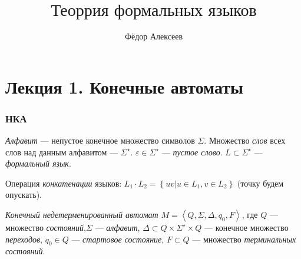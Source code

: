 

\newenvironment{lyxcode}
{\par\begin{list}{}{
\setlength{\rightmargin}{\leftmargin}
\setlength{\listparindent}{0pt}%
\raggedright
\setlength{\itemsep}{0pt}
\setlength{\parsep}{0pt}
\normalfont\ttfamily}%
 \item[]}
{\end{list}}



\title{$\mbox{Теоррия формальных языков}$}
\author{Фёдор Алексеев}

\maketitle
\gitlink\tableofcontents\newpage{}

\part*{Лекция 1. Конечные автоматы}

\section{НКА}
\begin{define*}
\emph{Алфавит} --- непустое конечное множество символов $\Sigma$.
Множество \emph{слов} всех слов над данным алфавитом --- $\Sigma^{\star}$.
$\varepsilon\in\Sigma^{\star}$ --- \emph{пустое слово}. $L\subset\Sigma^{\star}$
--- \emph{формальный язык}.

Операция \emph{конкатенации} языков: $L_{1}\cdot L_{2}=\left\{ uv|u\in L_{1},v\in L_{2}\right\} $
(точку будем опускать).
\end{define*}

\begin{define*}
\emph{Конечный недетерменированный автомат }$M=\left\langle Q,\Sigma,\Delta,q_{0},F\right\rangle $,
где $Q$ --- множество \emph{состояний},$\Sigma$ --- \emph{алфавит},
$\Delta\subset Q\times\Sigma^{\star}\times Q$ --- конечное множество
\emph{переходов}, $q_{0}\in Q$ --- \emph{стартовое состояние}, $F\subset Q$
--- множество \emph{терминальных состояний}.
\end{define*}

